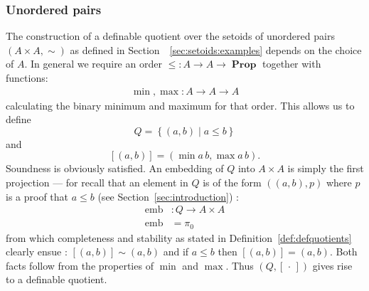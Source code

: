 \documentclass[envcountsame]{llncs}
\newcommand{\dotph}{\,\cdot\,} %
\providecommand{\class}[1]{[#1]}
\providecommand{\set}  [1]{\left\{#1\right\}}
\DeclareMathOperator{\Prop}{\mathbf{Prop}}
\DeclareMathOperator{\emb}{emb}
\begin{document}
\subsubsection*{Unordered pairs}

The construction of a definable quotient over the setoids of unordered pairs $(A\times A,\sim)$ as defined in Section~~\ref{sec:setoids:examples} depends on the choice of $A$. In general we
require an order $\leq : A \to A \to \Prop$ together with functions:
\begin{align*}
\min, \max : A \to A \to A
\end{align*}
calculating the binary minimum and maximum for that order. This allows us to  define
\[
Q = \set{(a , b) \mid  a \leq b}
\]
and
\[ [(a,b)] = (\min a\, b, \max a \,b).\]
Soundness is obviously satisfied. An embedding of $Q$ into  $A\times A$ is simply the first projection --- for recall that an element in $Q$ is of the form $((a,b),p)$ where $p$ is a proof that $a\leq b$ (see Section~\ref{sec:introduction}) :
\begin{align*}
\emb &: Q \to A\times A\\
\emb &= \pi_0
\end{align*}
from which completeness and stability as stated in Definition~\ref{def:defquotients} clearly ensue : $[(a,b)] \sim (a,b)$ and if $a\leq b$ then $[(a,b)]=(a,b)$. Both facts follow from
 the properties of $\min$ and $\max$.
Thus $(Q,\class\dotph)$ gives rise to a definable quotient.
\end{document}
